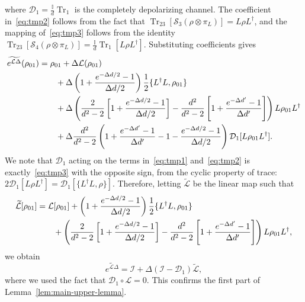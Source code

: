 \documentclass[superscriptaddress,amsmath,amssymb,aps,pra,letterpaper,tightenlines,notitlepages,12pt]{revtex4-2}
\begin{document}
where $\mathcal{D}_1=\frac{\mathbb{I}}{d}\operatorname{Tr}_1$ is the completely depolarizing channel. The coefficient in~\eqref{eq:tmp2} follows from the fact that $\operatorname{Tr}_{23}[\mathcal{S}_3(\rho\otimes\pi_L)]=L\rho L^\dagger$, and the mapping of~\eqref{eq:tmp3} follows from the identity $\operatorname{Tr}_{23}[\mathcal{S}_4(\rho\otimes\pi_L)]=\tfrac{\mathbb{I}}{d}\operatorname{Tr}_1[L\rho L^\dagger]$. Substituting coefficients gives
\begin{align}
    \widetilde{e^{\mathcal{L}\Delta}}(\rho_{01})
    &=\rho_{01}+\Delta\mathcal{L}(\rho_{01}) \notag \\
    &\qquad +\Delta\left(1+\frac{e^{-\Delta d/2}-1}{\Delta d/2}\right)\frac{1}{2}\{L^\dagger L, \rho_{01} \} \notag \\
    &\qquad +\Delta\left(\frac{2}{d^2-2}\left[1+\frac{e^{-\Delta d/2}-1}{\Delta d/2}\right]-\frac{d^2}{d^2-2}\left[1+\frac{e^{-\Delta d'}-1}{\Delta d'}\right]\right) L\rho_{01} L^\dagger \notag \\
    &\qquad +\Delta \frac{d^2}{d^2-2}\left(1+\frac{e^{-\Delta d'}-1}{\Delta d'}-1-\frac{e^{-\Delta d/2}-1}{\Delta d/2}\right) \mathcal{D}_1[L\rho_{01}L^\dagger].
\end{align}
We note that $\mathcal{D}_1$ acting on the terms in~\eqref{eq:tmp1} and~\eqref{eq:tmp2} is exactly~\eqref{eq:tmp3} with the opposite sign, from the cyclic property of trace: $2\mathcal{D}_1[L\rho L^\dagger] = \mathcal{D}_1[\{L^\dagger L,\rho\}]$. Therefore, letting $\widetilde{\mathcal{L}}$ be the linear map such that
\begin{align}
    \widetilde{\mathcal{L}}[\rho_{01}]&= \mathcal{L}[\rho_{01}] + \left(1+\frac{e^{-\Delta d/2}-1}{\Delta d/2}\right)\frac{1}{2}\{L^\dagger L, \rho_{01} \} \notag \\
    &\qquad+\left(\frac{2}{d^2-2}\left[1+\frac{e^{-\Delta d/2}-1}{\Delta d/2}\right]-\frac{d^2}{d^2-2}\left[1+\frac{e^{-\Delta d'}-1}{\Delta d'}\right]\right) L\rho_{01} L^\dagger,
\end{align}
we obtain
\begin{equation}
    \widetilde{e^{\mathcal{L}\Delta}}=\mathcal{I} + \Delta(\mathcal{I}-\mathcal{D}_1)\widetilde{\mathcal{L}},
\end{equation}
where we used the fact that $\mathcal{D}_1 \circ \mathcal{L} = 0$.
This confirms the first part of Lemma~\ref{lem:main-upper-lemma}.
\end{document}
